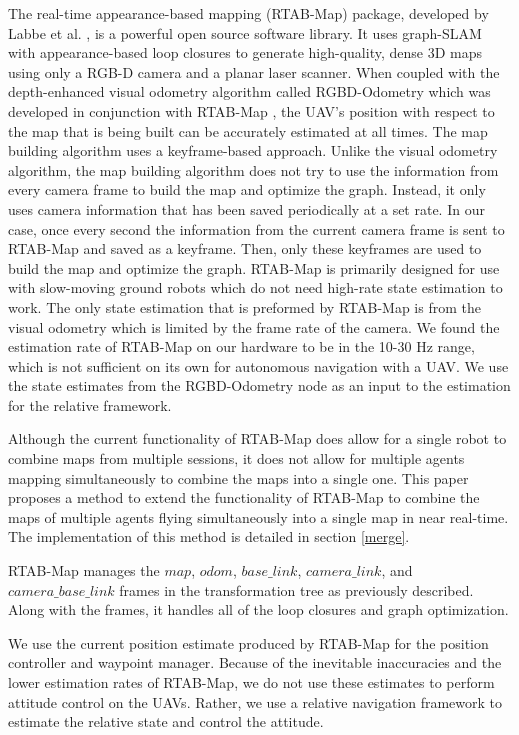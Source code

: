 \documentclass[letterpaper, 10 pt, conference]{ieeeconf}  %
\begin{document}
The real-time appearance-based mapping (RTAB-Map) package, developed by Labbe et al. \cite{Labbe2011}\cite{Labbe2013}\cite{Labbe2019}, is a powerful open source software library. It uses graph-SLAM with appearance-based loop closures to generate high-quality, dense 3D maps using only a RGB-D camera and a planar laser scanner. When coupled with the depth-enhanced visual odometry algorithm called RGBD-Odometry which was developed in conjunction with RTAB-Map \cite{Labbe2019}, the UAV's position with respect to the map that is being built can be accurately estimated at all times. The map building algorithm uses a keyframe-based approach. Unlike the visual odometry algorithm, the map building algorithm does not try to use the information from every camera frame to build the map and optimize the graph. Instead, it only uses camera information that has been saved periodically at a set rate. In our case, once every second the information from the current camera frame is sent to RTAB-Map and saved as a keyframe. Then, only these keyframes are used to build the map and optimize the graph. RTAB-Map is primarily designed for use with slow-moving ground robots which do not need high-rate state estimation to work. The only state estimation that is preformed by RTAB-Map is from the visual odometry which is limited by the frame rate of the camera. We found the estimation rate of RTAB-Map on our hardware to be in the 10-30 Hz range, which is not sufficient on its own for autonomous navigation with a UAV. We use the state estimates from the RGBD-Odometry node as an input to the estimation for the relative framework.

Although the current functionality of RTAB-Map does allow for a single robot to combine maps from multiple sessions, it does not allow for multiple agents mapping simultaneously to combine the maps into a single one. This paper proposes a method to extend the functionality of RTAB-Map to combine the maps of multiple agents flying simultaneously into a single map in near real-time. The implementation of this method is detailed in section \ref{merge}.

RTAB-Map manages the $\mathit{map}$, $\mathit{odom}$, $\mathit{base\_link}$, $\mathit{camera\_link}$, and $\mathit{camera\_base\_link}$ frames in the transformation tree as previously described. Along with the frames, it handles all of the loop closures and graph optimization.

We use the current position estimate produced by RTAB-Map for the position controller and waypoint manager. Because of the inevitable inaccuracies and the lower estimation rates of RTAB-Map, we do not use these estimates to perform attitude control on the UAVs. Rather, we use a relative navigation framework to estimate the relative state and control the attitude.
\end{document}

